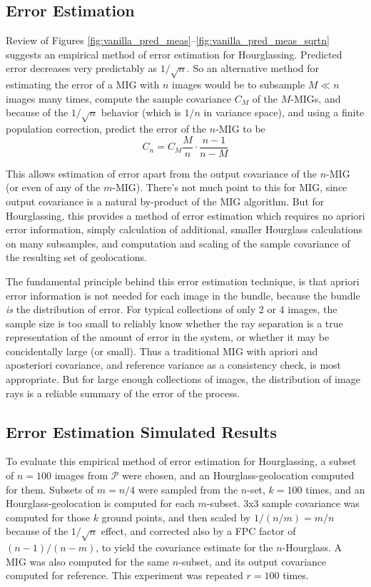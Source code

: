 \documentclass[10pt]{amsart}
\newcommand{\Pimg}{\mathcal{P}}
\begin{document}
\subsection{Error Estimation}
Review of Figures \ref{fig:vanilla_pred_meas}--\ref{fig:vanilla_pred_meas_sqrtn}
suggests an empirical meth\-od of error estimation for Hourglassing. Predicted
error decreases very predictably as $1/\sqrt n$. So an alternative method for
estimating the error of a MIG with $n$ images would be to subsample $M \ll n$
images many times, compute the sample covariance $C_M$ of the $M$-MIGs, and
because of the $1/\sqrt n$ behavior (which is $1/n$ in variance space), and
using a finite population correction, predict the error of the $n$-MIG to
be $$C_n=C_M\frac{M}{n}\cdot\frac{n-1}{n-M}$$

This allows estimation of error apart from the output covariance of the $n$-MIG
(or even of any of the $m$-MIG). There's not much point to this for MIG, since
output covariance is a natural by-product of the MIG algorithm. But for
Hourglassing, this provides a method of error estimation which requires no
apriori error information, simply calculation of additional, smaller Hourglass
calculations on many subsamples, and computation and scaling of the sample
covariance of the resulting set of geolocations.

The fundamental principle behind this error estimation technique, is that
apriori error information is not needed for each image in the bundle, because
the bundle {\em is} the distribution of error. For typical collections of only 2
or 4 images, the sample size is too small to reliably know whether the ray
separation is a true representation of the amount of error in the system, or
whether it may be concidentally large (or small). Thus a traditional MIG with
apriori and aposteriori covariance, and reference variance as a consistency
check, is most appropriate. But for large enough collections of images, the
distribution of image rays is a reliable summary of the error of the process.

\subsection{\label{hsimulation}Error Estimation Simulated Results}
To evaluate this empirical method of error estimation for Hourglassing, a subset
of $n=100$ images from $\Pimg$ were chosen, and an Hourglass-geolocation
computed for them. Subsets of $m=n/4$ were sampled from the $n$-set, $k=100$
times, and an Hourglass-geolocation is computed for each $m$-subset. 3x3 sample
covariance was computed for those $k$ ground points, and then scaled by
$1/(n/m)=m/n$ because of the $1/\sqrt{n}$ effect, and corrected also by a FPC
factor of $(n-1)/(n-m)$, to yield the covariance estimate for the
$n$-Hourglass. A MIG was also computed for the same $n$-subset, and its output
covariance computed for reference. This experiment was repeated $r=100$ times.
\end{document}
